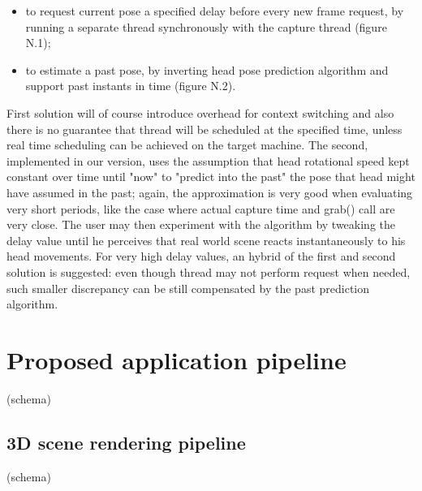 \begin{itemize}
\item to request current pose a specified delay before every new frame request, by running a separate thread synchronously with the capture thread (figure N.1);
\item to estimate a past pose, by inverting head pose prediction algorithm and support past instants in time (figure N.2).
\end{itemize}
First solution will of course introduce overhead for context switching and also there is no guarantee that thread will be scheduled at the specified time, unless real time scheduling can be achieved on the target machine. The second, implemented in our version, uses the assumption that head rotational speed kept constant over time until "now" to "predict into the past" the pose that head might have assumed in the past; again, the approximation is very good when evaluating very short periods, like the case where actual capture time and grab() call are very close. The user may then experiment with the algorithm by tweaking the delay value until he perceives that real world scene reacts instantaneously to his head movements. For very high delay values, an hybrid of the first and second solution is suggested: even though thread may not perform request when needed, such smaller discrepancy can be still compensated by the past prediction algorithm.

\section{Proposed application pipeline}

(schema)

\subsection{3D scene rendering pipeline}

(schema)

